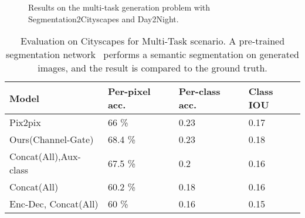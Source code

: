 \begin{figure}[t]
    \caption{Results on the multi-task generation problem with Segmentation2Cityscapes and Day2Night. }
    \label{fig:multi-task_day2night}
    \vspace{-3mm}
\end{figure}


\begin{table}[ht]
\caption{Evaluation on Cityscapes for Multi-Task scenario. A pre-trained segmentation network~\cite{} performs a semantic segmentation on generated images, and the result is compared to the ground truth.} %
\small
\centering %
\begin{tabular}{p{3cm}p{1cm}p{1cm}p{1cm}} %
\toprule
\textbf{Model} & \textbf{Per-pixel acc.} &  \textbf{Per-class acc.} & \textbf{Class IOU} \\%
\midrule
Pix2pix \cite{isola2016image2image} & 66 \%  & 0.23 & 0.17 \\ %
\midrule
Ours(Channel-Gate) & 68.4 \%  & 0.23 & 0.18 \\
\midrule
Concat(All),Aux-class & 67.5 \% & 0.2 & 0.16 \\
\midrule
Concat(All) & 60.2 \% & 0.18 & 0.16 \\
\midrule
Enc-Dec, Concat(All) & 60 \% & 0.16 & 0.15 \\
\bottomrule %
\end{tabular}
\label{table:1d_G} %
\end{table}

